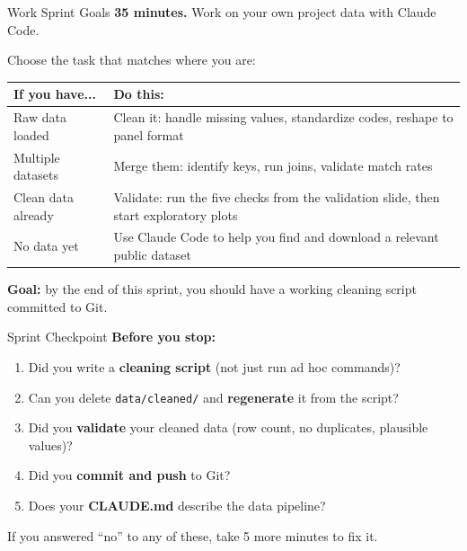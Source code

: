 \begin{frame}{Work Sprint Goals}
  \textbf{\textcolor{usfgreen}{35 minutes.}} Work on your own project data with Claude Code.

  \vspace{6pt}

  Choose the task that matches where you are:

  \vspace{4pt}

  \small
  \begin{tabular}{@{}l>{\raggedright\arraybackslash}p{8.5cm}@{}}
    \toprule
    \textbf{If you have...} & \textbf{Do this:} \\
    \midrule
    Raw data loaded &
      Clean it: handle missing values, standardize codes, reshape to panel format \\[4pt]
    Multiple datasets &
      Merge them: identify keys, run joins, validate match rates \\[4pt]
    Clean data already &
      Validate: run the five checks from the validation slide, then start exploratory plots \\[4pt]
    No data yet &
      Use Claude Code to help you find and download a relevant public dataset \\
    \bottomrule
  \end{tabular}

  \normalsize
  \vspace{6pt}

  \textbf{Goal:} by the end of this sprint, you should have a working cleaning script committed to Git.
\end{frame}

\begin{frame}{Sprint Checkpoint}
  \textbf{Before you stop:}

  \vspace{8pt}

  \begin{enumerate}
    \item Did you write a \textbf{cleaning script} (not just run ad hoc commands)?
    \item Can you delete \texttt{data/cleaned/} and \textbf{regenerate} it from the script?
    \item Did you \textbf{validate} your cleaned data (row count, no duplicates, plausible values)?
    \item Did you \textbf{commit and push} to Git?
    \item Does your \textbf{CLAUDE.md} describe the data pipeline?
  \end{enumerate}

  \vspace{8pt}

  If you answered ``no'' to any of these, take 5 more minutes to fix it.
\end{frame}

